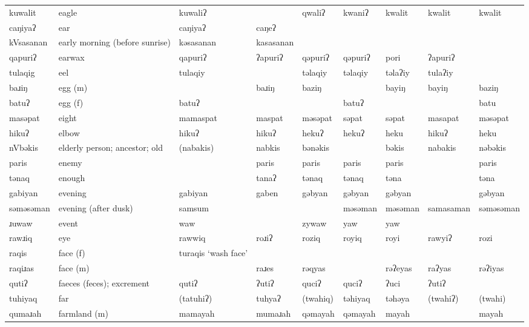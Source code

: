 \begin{landscape}
\begin{longtable}{*{9}{>{\raggedright\arraybackslash}p{}}}
\text{*}kuwalit      & eagle & kuwaliʔ &  & qwaliʔ & kwaniʔ & kwalit & kwalit & kwalit\\
\text{*}caŋiyaʔ      & ear & caŋiyaʔ & caŋeʔ &  &  &  &  & \\
\text{*}kVsasanan    & early morning (before sunrise) & kəsasanan & kasasanan &  &  &  &  & \\
\text{*}qapuriʔ      & earwax & qapuriʔ & ʔapuriʔ & qəpuriʔ & qəpuriʔ & pori & ʔapuriʔ & \\
\text{*}tulaqig      & eel & tulaqiy &  & təlaqiy & təlaqiy & təlaʔiy & tulaʔiy & \\
\text{*}baɹiŋ        & egg (m) &  & baɹiŋ & baziŋ &  & bayiŋ & bayiŋ & baziŋ\\
\text{*}batuʔ        & egg (f) & batuʔ &  &  & batuʔ &  &  & batu\\
\text{*}masəpat      & eight & mamaspat & maspat & məsəpat & səpat & səpat & masapat & məsəpat\\
\text{*}hikuʔ        & elbow & hikuʔ & hikuʔ & hekuʔ & hekuʔ & heku & hikuʔ & heku\\
\text{*}nVbəkis      & elderly person; ancestor; old & (nabakis) & nabkis & bənəkis &  & bəkis & nabakis & nəbəkis\\
\text{*}paris        & enemy &  & paris & paris & paris & paris &  & paris\\
\text{*}tənaq        & enough &  & tanaʔ & tənaq & tənaq & təna &  & təna\\
\text{*}gabiyan      & evening & gabiyan & gaben & gəbyan & gəbyan & gəbyan &  & gəbyan\\
\text{*}səməsəman    & evening (after dusk) & samsum &  &  & məsəman & məsəman & samasaman & səməsəman\\
\text{*}ɹuwaw        & event & waw &  & zywaw & yaw & yaw &  & \\
\text{*}rawɹiq       & eye & rawwiq & roɹiʔ & roziq & royiq & royi & rawyiʔ & rozi\\
\text{*}raqis        & face (f) & turaqis \newline `wash face' &  &  &  &  &  & \\
\text{*}raqiɹas      & face (m) &  & raɹes & rəqyas &  & rəʔeyas & raʔyas & rəʔiyas\\
\text{*}qutiʔ        & faeces (feces); excrement & qutiʔ & ʔutiʔ & quciʔ & quciʔ & ʔuci & ʔutiʔ & \\
\text{*}tuhiyaq      & far & (tatuhiʔ) & tuhyaʔ & (twahiq) & təhiyaq & təhəya & (twahiʔ) & (twahi)\\
\text{*}qumaɹah      & farmland (m) & mamayah & mumaɹah & qəmayah & qəmayah & mayah &  & mayah\\

\end{longtable}
\end{landscape}
